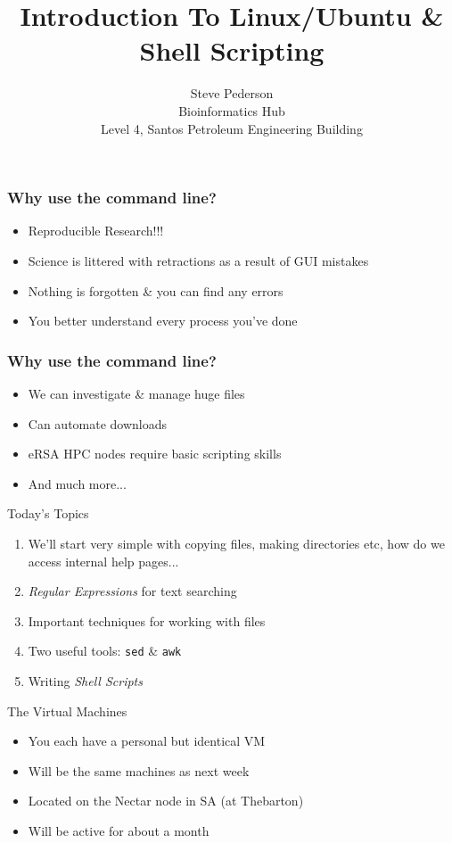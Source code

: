 \documentclass[11pt]{beamer}
\author{Steve Pederson\\
Bioinformatics Hub\\
Level 4, Santos Petroleum Engineering Building}
\title{Introduction To Linux/Ubuntu \& Shell Scripting}
\institute{University of Adelaide}
\let\oldframetitle\frametitle%
\renewcommand{\frametitle}[1]{%
  \oldframetitle{#1}\setstretch{2}}
\begin{document}
\begin{frame}
\titlepage
\end{frame}


\begin{frame}
\frametitle{Why use the command line?}
\begin{itemize}
\item Reproducible Research!!!
\item Science is littered with retractions as a result of GUI mistakes
\item Nothing is forgotten \& you can find any errors
\item You better understand every process you've done
\end{itemize}
\end{frame}

\begin{frame}
\frametitle{Why use the command line?}
\begin{itemize}
\item We can investigate \& manage huge files
\item Can automate downloads
\item eRSA HPC nodes require basic scripting skills
\item And much more...
\end{itemize}
\end{frame}

\begin{frame}{Today's Topics}
\begin{enumerate}
\item We'll start very simple with copying files, making directories etc, how do we access internal help pages...
\item \textit{Regular Expressions} for text searching
\item Important techniques for working with files
\item Two useful tools: \texttt{sed} \& \texttt{awk}
\item Writing \textit{Shell Scripts}
\end{enumerate}
\end{frame}

\begin{frame}{The Virtual Machines}
\begin{itemize}
\item You each have a personal but identical VM
\item Will be the same machines as next week
\item Located on the Nectar node in SA (at Thebarton)
\item Will be active for about a month
\end{itemize}
\end{frame}
\end{document}
